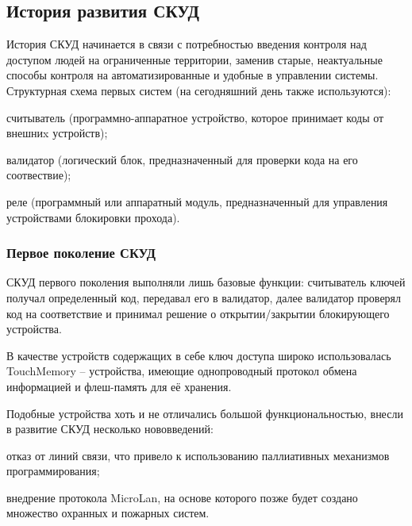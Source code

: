 \subsection{История развития СКУД}

История СКУД начинается в связи с потребностью введения контроля над доступом людей на ограниченные территории, заменив старые, неактуальные способы контроля на автоматизированные и удобные в управлении системы. Структурная схема первых систем (на сегодняшний день также используются):

\begin{itemize*}
\item считыватель (программно-аппаратное устройство, которое принимает коды от внешниx устройств);
\item валидатор (логический блок, предназначенный для проверки кода на его соотвествие);
\item реле (программный или аппаратный модуль, предназначенный для управления устройствами блокировки прохода).
\end{itemize*}

\subsubsection{Первое поколение СКУД}

СКУД первого поколения выполняли лишь базовые функции: считыватель ключей получал определенный код, передавал его в валидатор, далее валидатор проверял код на соответствие и принимал решение о открытии/закрытии блокирующего устройства.


В качестве устройств содержащих в себе ключ доступа широко использовалась TouchMemory -- устройства, имеющие однопроводный протокол обмена информацией и флеш-память для её хранения.


Подобные устройства хоть и не отличались большой функциональностью, внесли в развитие СКУД несколько нововведений:

\begin{itemize*}
\item отказ от линий связи, что привело к использованию паллиативных механизмов программирования;
\item внедрение протокола MicroLan, на основе которого позже будет создано множество охранных и пожарных систем.
\end{itemize*}

